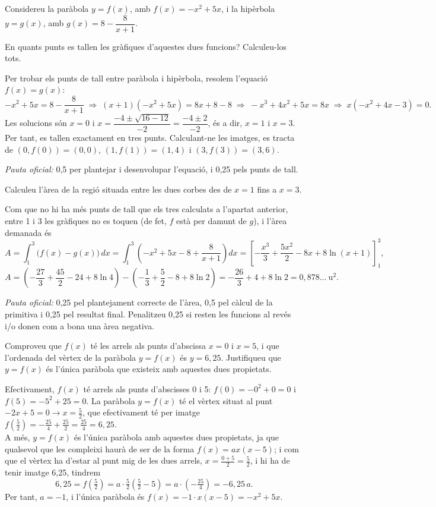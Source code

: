 Considereu la paràbola $y=f(x)$, amb $f(x)=-x^2+5x$, i la hipèrbola $y=g(x)$, amb
$g(x)=8-\dfrac{8}{x+1}$.

\begin{apartats}

En quants punts es tallen les gràfiques d'aquestes dues funcions? Calculeu-los tots.

\begin{solucio}
Per trobar els punts de tall entre paràbola i hipèrbola, resolem l'equació $f(x)=g(x)$:
\[
-x^2+5x=8-\frac{8}{x+1}\;\Rightarrow\;(x+1)\left(-x^2+5x\right)=8x+8-8\;\Rightarrow\;-x^3+4x^2+5x=8x
\;\Rightarrow\;x\left(-x^2+4x-3\right)=0 .
\]
Les solucions són $x=0$ i $x=\dfrac{-4\pm\sqrt{16-12}}{-2}=\dfrac{-4\pm2}{-2}$, és a dir, $x=1$ i $x=3$. Per
tant, es tallen exactament en tres punts. Calculant-ne les imatges, es tracta de $(0,f(0))=(0,0)$,
$(1,f(1))=(1,4)$ i $(3,f(3))=(3,6)$.

\textit{Pauta oficial:} 0,5 per plantejar i desenvolupar l'equació, i 0,25 pels punts de tall.
\end{solucio}

Calculeu l'àrea de la regió situada entre les dues corbes des de $x=1$ fins a $x=3$.

\begin{solucio}
Com que no hi ha més punts de tall que els tres calculats a l'apartat anterior, entre 1 i 3 les gràfiques
no es toquen (de fet, $f$ està per damunt de $g$), i l'àrea demanada és
\[
A=\int_1^3\bigl(f(x)-g(x)\bigr)\,dx=\int_1^3\left(-x^2+5x-8+\frac{8}{x+1}\right)dx
=\left[-\frac{x^3}{3}+\frac{5x^2}{2}-8x+8\ln(x+1)\right]_1^3 ,
\]
\[
A=\left(-\frac{27}{3}+\frac{45}{2}-24+8\ln4\right)-\left(-\frac13+\frac52-8+8\ln2\right)
=-\frac{26}{3}+4+8\ln2=0{,}878\ldots\ \text{u}^2 .
\]

\textit{Pauta oficial:} 0,25 pel plantejament correcte de l'àrea, 0,5 pel càlcul de la primitiva i 0,25
pel resultat final. Penalitzeu 0,25 si resten les funcions al revés i/o donen com a bona una àrea
negativa.
\end{solucio}

Comproveu que $f(x)$ té les arrels als punts d'abscissa $x=0$ i $x=5$, i que l'ordenada del vèrtex de la
paràbola $y=f(x)$ és $y=6{,}25$. Justifiqueu que $y=f(x)$ és l'única paràbola que existeix amb aquestes dues
propietats.

\begin{solucio}
Efectivament, $f(x)$ té arrels als punts d'abscisses 0 i 5: $f(0)=-0^2+0=0$ i $f(5)=-5^2+25=0$. La paràbola
$y=f(x)$ té el vèrtex situat al punt $-2x+5=0\rightarrow x=\frac52$, que efectivament té per imatge
$f\!\left(\frac52\right)=-\frac{25}{4}+\frac{25}{2}=\frac{25}{4}=6{,}25$.\\
A més, $y=f(x)$ és l'única paràbola amb aquestes dues propietats, ja que qualsevol que les compleixi haurà
de ser de la forma $f(x)=ax(x-5)$; i com que el vèrtex ha d'estar al punt mig de les dues arrels,
$x=\frac{0+5}{2}=\frac52$, i hi ha de tenir imatge 6,25, tindrem
\[
6{,}25=f\!\left(\tfrac52\right)=a\cdot\tfrac52\left(\tfrac52-5\right)=a\cdot\left(-\tfrac{25}{4}\right)=-6{,}25\,a .
\]
Per tant, $a=-1$, i l'única paràbola és $f(x)=-1\cdot x(x-5)=-x^2+5x$.


\end{solucio}
\end{apartats}
